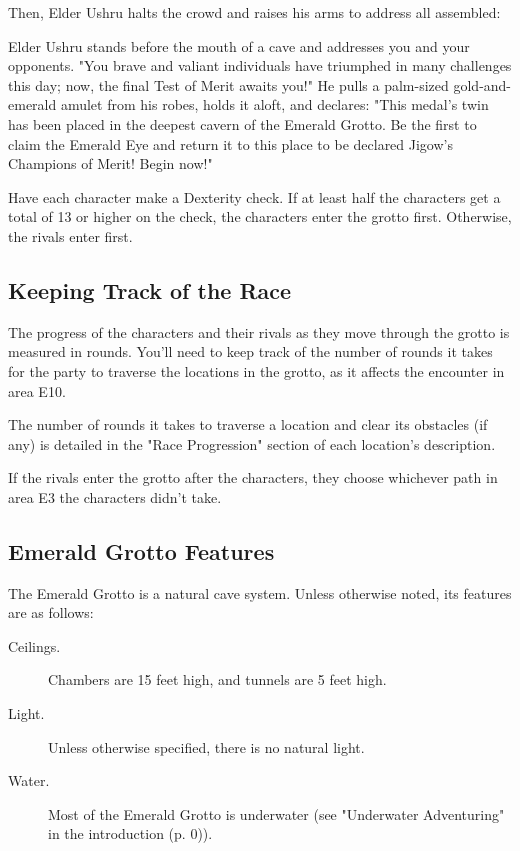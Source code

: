 \documentclass[letterpaper, 11pt, bg=full, twocolumn]{dndbook}
\begin{document}
Then, Elder Ushru halts the crowd and raises his arms to address all assembled:


\begin{DndReadAloud}
Elder Ushru stands before the mouth of a cave and addresses you and your opponents. "You brave and valiant individuals have triumphed in many challenges this day; now, the final Test of Merit awaits you!" He pulls a palm-sized gold-and-emerald amulet from his robes, holds it aloft, and declares: "This medal's twin has been placed in the deepest cavern of the Emerald Grotto. Be the first to claim the Emerald Eye and return it to this place to be declared Jigow's Champions of Merit! Begin now!"
\end{DndReadAloud}

Have each character make a Dexterity check. If at least half the characters get a total of 13 or higher on the check, the characters enter the grotto first. Otherwise, the rivals enter first.

\subsection{Keeping Track of the Race}

The progress of the characters and their rivals as they move through the grotto is measured in rounds. You'll need to keep track of the number of rounds it takes for the party to traverse the locations in the grotto, as it affects the encounter in area E10.

The number of rounds it takes to traverse a location and clear its obstacles (if any) is detailed in the "Race Progression" section of each location's description.

If the rivals enter the grotto after the characters, they choose whichever path in area E3 the characters didn't take.

\subsection{Emerald Grotto Features}

The Emerald Grotto is a natural cave system. Unless otherwise noted, its features are as follows:

\begin{description}
\item[Ceilings.] Chambers are 15 feet high, and tunnels are 5 feet high.
\item[Light.] Unless otherwise specified, there is no natural light.
\item[Water.] Most of the Emerald Grotto is underwater (see "Underwater Adventuring" in the introduction (p. 0)).
\end{description}
\end{document}
